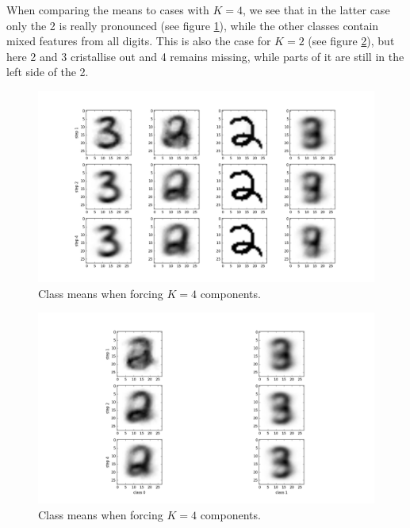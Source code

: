 When comparing the means to cases with $K=4$, we see that in the latter case only the 2 is really pronounced (see figure \ref{fig:43means4}), while the other classes contain mixed features from all digits. This is also the case for $K=2$ (see figure \ref{fig:43means2}), but here 2 and 3 cristallise out and 4 remains missing, while parts of it are still in the left side of the 2.

\begin{figure}[H]
	\centering \includegraphics{../Figures/Ex43_means4.png}
	\caption{Class means when forcing $K=4$ components.}
	\label{fig:43means4}
\end{figure}
\begin{figure}[H]
	\centering \includegraphics{../Figures/Ex43_means2.png}
	\caption{Class means when forcing $K=4$ components.}
	\label{fig:43means2}
\end{figure}

